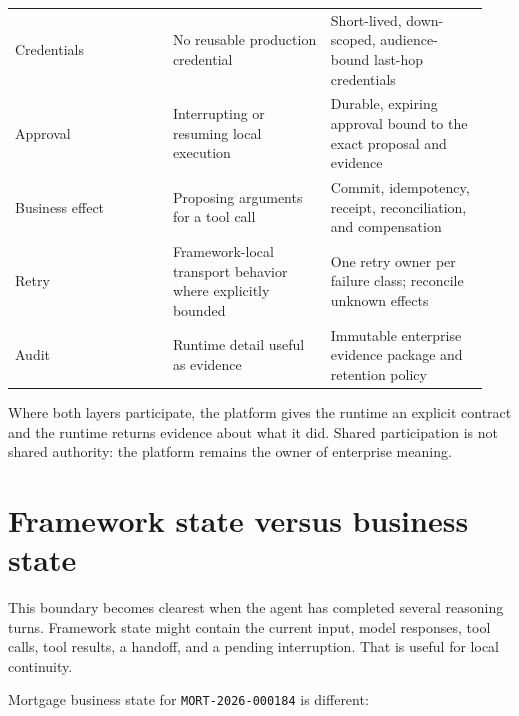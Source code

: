 \begin{longtable}{@{}Y{0.3133\linewidth}Y{0.3133\linewidth}Y{0.3133\linewidth}@{}}
Credentials & No reusable production credential & Short-lived, down-scoped, audience-bound last-hop credentials \\
Approval & Interrupting or resuming local execution & Durable, expiring approval bound to the exact proposal and evidence \\
Business effect & Proposing arguments for a tool call & Commit, idempotency, receipt, reconciliation, and compensation \\
Retry & Framework-local transport behavior where explicitly bounded & One retry owner per failure class; reconcile unknown effects \\
Audit & Runtime detail useful as evidence & Immutable enterprise evidence package and retention policy \\
\end{longtable}
\BookTableEnd

Where both layers participate, the platform gives the runtime an explicit contract and the runtime returns evidence about what it did. Shared participation is not shared authority: the platform remains the owner of enterprise meaning.\par

\section{Framework state versus business state}

This boundary becomes clearest when the agent has completed several reasoning turns. Framework state might contain the current input, model responses, tool calls, tool results, a handoff, and a pending interruption. That is useful for local continuity.\par

Mortgage business state for \lstinline[style=bookinline]!MORT-2026-000184! is different:\par

